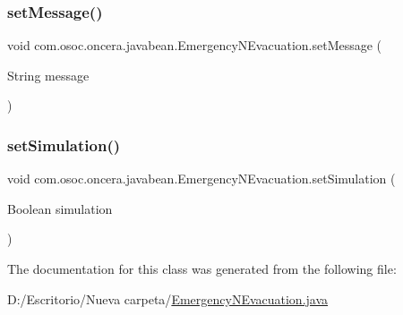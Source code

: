 \subsubsection{\texorpdfstring{setMessage()}{setMessage()}}
{\footnotesize\ttfamily void com.\+osoc.\+oncera.\+javabean.\+Emergency\+N\+Evacuation.\+set\+Message (\begin{DoxyParamCaption}\item[{String}]{message }\end{DoxyParamCaption})}

\mbox{\label{classcom_1_1osoc_1_1oncera_1_1javabean_1_1_emergency_n_evacuation_a43c43aec731eae8bc97b193d0ece3a67}} 
\subsubsection{\texorpdfstring{setSimulation()}{setSimulation()}}
{\footnotesize\ttfamily void com.\+osoc.\+oncera.\+javabean.\+Emergency\+N\+Evacuation.\+set\+Simulation (\begin{DoxyParamCaption}\item[{Boolean}]{simulation }\end{DoxyParamCaption})}



The documentation for this class was generated from the following file\+:\begin{DoxyCompactItemize}
\item 
D\+:/\+Escritorio/\+Nueva carpeta/\mbox{\hyperlink{_emergency_n_evacuation_8java}{Emergency\+N\+Evacuation.\+java}}\end{DoxyCompactItemize}
